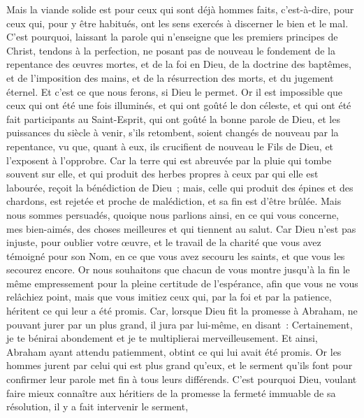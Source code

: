 \begin{multicols}{2}
Mais la viande solide est pour ceux qui sont déjà hommes faits, {c'est-à-dire}, pour ceux qui, pour y être habitués, ont les sens exercés à discerner le bien et le mal.
\VerseOne{}C'est pourquoi, laissant la parole qui n'enseigne que les premiers principes de Christ, tendons à la perfection, ne posant pas de nouveau le fondement de la repentance des œuvres mortes, et de la foi en Dieu,
de la doctrine des baptêmes, et de l'imposition des mains, et de la résurrection des morts, et du jugement éternel.
Et c'est ce que nous ferons, si Dieu le permet.
Or il est impossible que ceux qui ont été une fois illuminés, et qui ont goûté le don céleste, et qui ont été fait participants au Saint-Esprit,
qui ont goûté la bonne parole de Dieu, et les puissances du siècle à venir,
s'ils retombent, soient changés de nouveau par la repentance, vu que, quant à eux, ils crucifient de nouveau le Fils de Dieu, et l'exposent à l'opprobre.
Car la terre qui est abreuvée par la pluie qui tombe souvent sur elle, et qui produit des herbes propres à ceux par qui elle est labourée, reçoit la bénédiction de Dieu~;
mais, celle qui produit des épines et des chardons, est rejetée et proche de malédiction, et sa fin est d'être brûlée.
Mais nous sommes persuadés, quoique nous parlions ainsi, en ce qui vous concerne, mes bien-aimés, des choses meilleures et qui tiennent au salut.
Car Dieu n'est pas injuste, pour oublier votre œuvre, et le travail de la charité que vous avez témoigné pour son Nom, en ce que vous avez secouru les saints, et que vous les secourez encore.
Or nous souhaitons que chacun de vous montre jusqu'à la fin le même empressement pour la pleine certitude de l'espérance,
afin que vous ne vous relâchiez point, mais que vous imitiez ceux qui, par la foi et par la patience, héritent ce qui leur a été promis.
Car, lorsque Dieu fit la promesse à Abraham, ne pouvant jurer par un plus grand, il jura par lui-même,
en disant~: Certainement, je te bénirai abondement et je te multiplierai merveilleusement.
Et ainsi, Abraham ayant attendu patiemment, obtint ce qui lui avait été promis.
Or les hommes jurent par celui qui est plus grand qu'eux, et le serment qu'ils font pour confirmer leur parole met fin à tous leurs différends.
C'est pourquoi Dieu, voulant faire mieux connaître aux héritiers de la promesse la fermeté immuable de sa résolution, il y a fait intervenir le serment,

\end{multicols}
